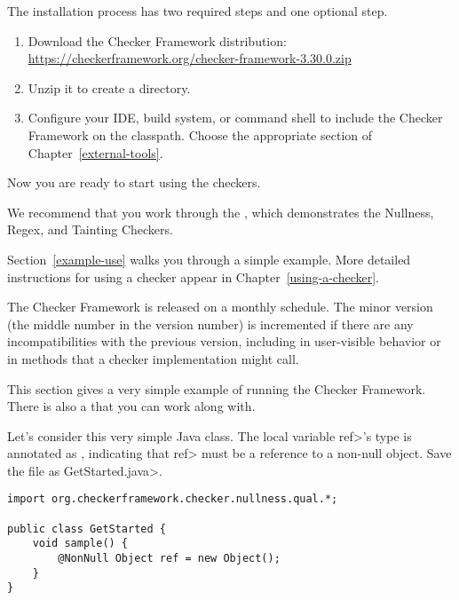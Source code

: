 The installation process has two required steps and one
optional step.
\begin{enumerate}
\item
  Download the Checker Framework distribution:
  \\
  \url{https://checkerframework.org/checker-framework-3.30.0.zip}

\item
  Unzip it to create a  directory.

\item
  \label{installation-configure-step}%
  Configure your IDE, build system, or command shell to include the Checker
  Framework on the classpath.  Choose the appropriate section of
  Chapter~\ref{external-tools}.


\end{enumerate}

Now you are ready to start using the checkers.

We recommend that you work through the
, which demonstrates the Nullness, Regex, and Tainting Checkers.

Section~\ref{example-use} walks you through a simple example.  More detailed
instructions for using a checker appear in Chapter~\ref{using-a-checker}.

\label{version-number}
The Checker Framework is released on a monthly schedule.  The minor version
(the middle number in the version number) is incremented if there are any
incompatibilities
with the previous version, including in user-visible
behavior or in methods that a checker implementation might call.



This section gives a very simple example of running the Checker Framework.
There is also a 
that you can work along with.

  Let's consider this very simple Java class.  The local variable \<ref>'s type is
  annotated as , indicating that \<ref> must be a reference to a
  non-null object.  Save the file as \<GetStarted.java>.

\begin{Verbatim}
import org.checkerframework.checker.nullness.qual.*;

public class GetStarted {
    void sample() {
        @NonNull Object ref = new Object();
    }
}
\end{Verbatim}

